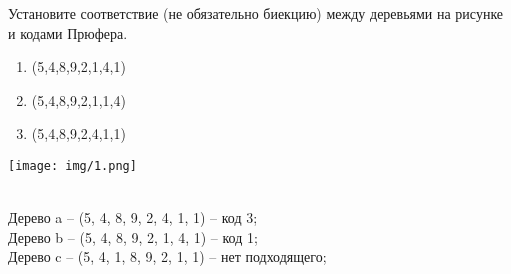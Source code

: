 \begin{task}{37}
	Установите соответствие (не обязательно биекцию) между деревьями на рисунке и кодами Прюфера.  
	\begin{enumerate}
	    \item (5,4,8,9,2,1,4,1)
	    \item (5,4,8,9,2,1,1,4)
	    \item (5,4,8,9,2,4,1,1)
	\end{enumerate}
	
	\texttt{[image: img/1.png]}
\end{task}

\begin{solution} \\
	Дерево a -- (5, 4, 8, 9, 2, 4, 1, 1) -- код 3;  \\
	Дерево b -- (5, 4, 8, 9, 2, 1, 4, 1) -- код 1;  \\
	Дерево c -- (5, 4, 1, 8, 9, 2, 1, 1) -- нет подходящего;
\end{solution}